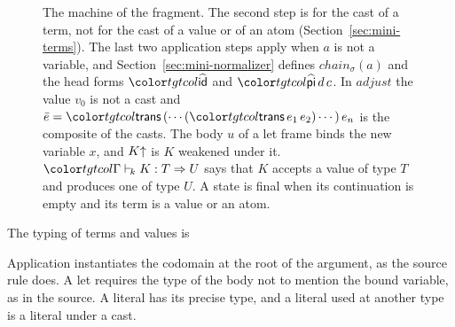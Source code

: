 \begin{figure}[t]
\color{black}
\caption{The machine of the fragment. The second step is for the cast of a term, not for the cast of a value or of an atom (Section~\ref{sec:mini-terms}). The last two application steps apply when $a$ is not a variable, and Section~\ref{sec:mini-normalizer} defines $\mathit{chain}_\sigma(a)$ and the head forms $\form{id}$ and $\form{pi}\,d\,c$. In $\mathit{adjust}$ the value $v_0$ is not a cast and $\bar{e} = \ev{trans}\,(\cdots(\ev{trans}\,e_1\,e_2)\cdots)\,e_n$ is the composite of the casts. The body $u$ of a let frame binds the new variable $x$, and $K{\uparrow}$ is $K$ weakened under it. $\contj{\Gamma}{K}{T}{U}$ says that $K$ accepts a value of type $T$ and produces one of type $U$. A state is final when its continuation is empty and its term is a value or an atom.}
\label{fig:mini-machine}
\end{figure}

The typing of terms and values is
Application instantiates the codomain at the root of the argument, as the source rule  does. A let requires the type of the body not to mention the bound variable, as in the source. A literal has its precise type, and a literal used at another type is a literal under a cast.

